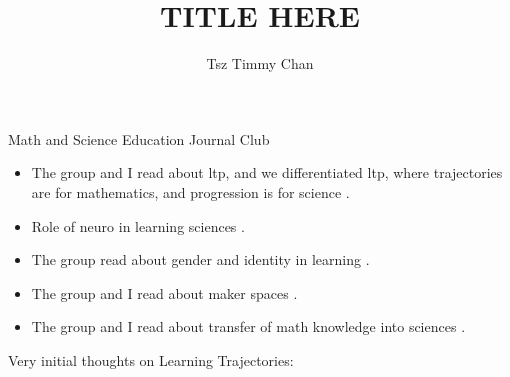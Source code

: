 \documentclass{TC}
\title{TITLE HERE}	%
\author{Tsz Timmy Chan}	%
\begin{document}
Math and Science Education Journal Club
\begin{itemize}
\item The group and I read about \gls{ltp}, and we differentiated \gls{ltp}, where trajectories are for mathematics, and progression is for science
 \parencite{duncan_learning_2018, schwarz_developing_2009, lobato_taxonomy_2017}. 
\item Role of neuro in learning sciences \parencite{jacobson_conceptualizing_2016}.
\item The group read about gender and identity in learning \parencite{darragh_identity_2016, liben_developmental_2014}.
\item The group and I read about maker spaces \parencite{halverson_maker_2018, blikstein_assessment_2017}.
\item The group and I read about transfer of math knowledge into sciences \parencite{britton_case_2005, roberts_index_2007, tariq_defining_2008}.

\end{itemize}

Very initial thoughts on Learning Trajectories: 


\end{document}
